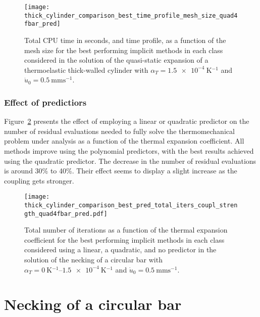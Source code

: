 \begin{figure}[hbtp]
 \centering
 \texttt{[image: thick\_cylinder\_comparison\_best\_time\_profile\_mesh\_size\_quad4fbar\_pred]}
 \caption{Total CPU time in seconds, and time profile, as a function of the mesh size for the  best performing implicit methods in each class considered in the solution of the quasi-static expansion of a thermoelastic thick-walled cylinder with \(\alpha_T=\SI{1.5e-4}{\kelvin^{-1}}\) and \(\dot u_0 =\SI{0.5}{\milli\meter\second^{-1}}\).}
\label{fig:thick_cylinder_comparison_best_time_profile_mesh_size_quad4fbar_pred}
\end{figure}

\FloatBarrier

\subsubsection{Effect of predictiors}

Figure~\ref{fig:thick_cylinder_comparison_best_pred_total_iters_coupl_strength_quad4fbar_pred.pdf} presents the effect of employing a linear or quadratic predictor on the number of residual evaluations needed to fully solve the thermomechanical problem under analysis as a function of the thermal expansion coefficient.
All methods improve using the polynomial predictors, with the best results achieved using the quadratic predictor.
The decrease in the number of residual evaluations is around 30\% to 40\%.
Their effect seems to display a slight increase as the coupling gets stronger.

\begin{figure}[hbtp]
 \centering
 \texttt{[image: thick\_cylinder\_comparison\_best\_pred\_total\_iters\_coupl\_strength\_quad4fbar\_pred.pdf]}
 \caption{Total number of iterations as a function of the thermal expansion coefficient for the  best performing implicit methods in each class considered using a linear, a quadratic, and no predictor in the solution of the necking of a circular bar with \(\alpha_T=\SIrange{0}{1.5e-4}{\kelvin^{-1}}\) and \(\dot u_0 =\SI{0.5}{\milli\meter\second^{-1}}\).}
\label{fig:thick_cylinder_comparison_best_pred_total_iters_coupl_strength_quad4fbar_pred.pdf}
\end{figure}

\FloatBarrier

\pagebreak

\section{Necking of a circular bar}
\label{sec:mech-driv-probl}

